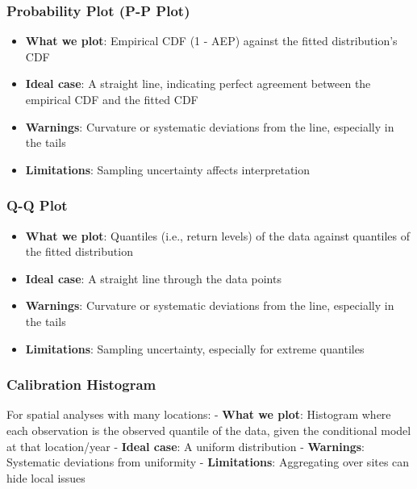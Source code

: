 \documentclass[
  letterpaper,
  DIV=11,
  numbers=noendperiod]{scrreprt}
\providecommand{\tightlist}{%
  \setlength{\itemsep}{0pt}\setlength{\parskip}{0pt}}
\begin{document}
\subsubsection{Probability Plot (P-P
Plot)}\label{probability-plot-p-p-plot}

\begin{itemize}
\tightlist
\item
  \textbf{What we plot}: Empirical CDF (1 - AEP) against the fitted
  distribution's CDF
\item
  \textbf{Ideal case}: A straight line, indicating perfect agreement
  between the empirical CDF and the fitted CDF
\item
  \textbf{Warnings}: Curvature or systematic deviations from the line,
  especially in the tails
\item
  \textbf{Limitations}: Sampling uncertainty affects interpretation
\end{itemize}

\subsubsection{Q-Q Plot}\label{q-q-plot}

\begin{itemize}
\tightlist
\item
  \textbf{What we plot}: Quantiles (i.e., return levels) of the data
  against quantiles of the fitted distribution
\item
  \textbf{Ideal case}: A straight line through the data points
\item
  \textbf{Warnings}: Curvature or systematic deviations from the line,
  especially in the tails
\item
  \textbf{Limitations}: Sampling uncertainty, especially for extreme
  quantiles
\end{itemize}

\subsubsection{Calibration Histogram}\label{calibration-histogram}

For spatial analyses with many locations: - \textbf{What we plot}:
Histogram where each observation is the observed quantile of the data,
given the conditional model at that location/year - \textbf{Ideal case}:
A uniform distribution - \textbf{Warnings}: Systematic deviations from
uniformity - \textbf{Limitations}: Aggregating over sites can hide local
issues
\end{document}
